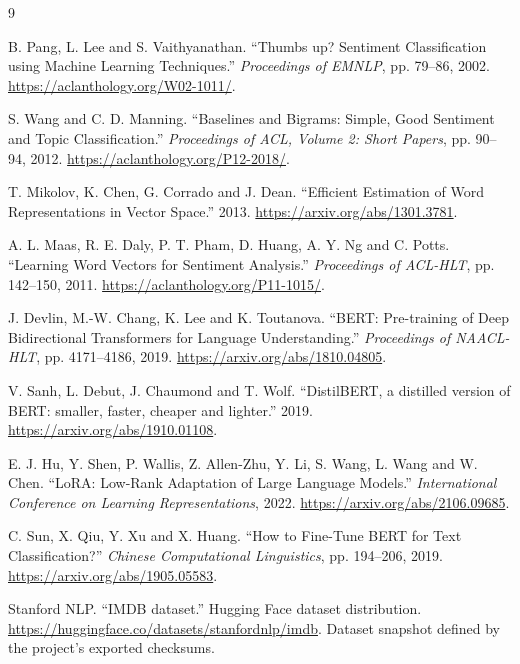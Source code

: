 \begin{thebibliography}{9}
\raggedright
{}
B. Pang, L. Lee and S. Vaithyanathan.
``Thumbs up? Sentiment Classification using Machine Learning Techniques.''
\textit{Proceedings of EMNLP}, pp. 79--86, 2002.
\url{https://aclanthology.org/W02-1011/}.

S. Wang and C. D. Manning.
``Baselines and Bigrams: Simple, Good Sentiment and Topic Classification.''
\textit{Proceedings of ACL, Volume 2: Short Papers}, pp. 90--94, 2012.
\url{https://aclanthology.org/P12-2018/}.

T. Mikolov, K. Chen, G. Corrado and J. Dean.
``Efficient Estimation of Word Representations in Vector Space.'' 2013.
\url{https://arxiv.org/abs/1301.3781}.

A. L. Maas, R. E. Daly, P. T. Pham, D. Huang, A. Y. Ng and C. Potts.
``Learning Word Vectors for Sentiment Analysis.''
\textit{Proceedings of ACL-HLT}, pp. 142--150, 2011.
\url{https://aclanthology.org/P11-1015/}.

J. Devlin, M.-W. Chang, K. Lee and K. Toutanova.
``BERT: Pre-training of Deep Bidirectional Transformers for Language Understanding.''
\textit{Proceedings of NAACL-HLT}, pp. 4171--4186, 2019.
\url{https://arxiv.org/abs/1810.04805}.

V. Sanh, L. Debut, J. Chaumond and T. Wolf.
``DistilBERT, a distilled version of BERT: smaller, faster, cheaper and lighter.''
2019. \url{https://arxiv.org/abs/1910.01108}.

E. J. Hu, Y. Shen, P. Wallis, Z. Allen-Zhu, Y. Li, S. Wang, L. Wang and W. Chen.
``LoRA: Low-Rank Adaptation of Large Language Models.''
\textit{International Conference on Learning Representations}, 2022.
\url{https://arxiv.org/abs/2106.09685}.

C. Sun, X. Qiu, Y. Xu and X. Huang.
``How to Fine-Tune BERT for Text Classification?''
\textit{Chinese Computational Linguistics}, pp. 194--206, 2019.
\url{https://arxiv.org/abs/1905.05583}.

Stanford NLP. ``IMDB dataset.'' Hugging Face dataset distribution.
\url{https://huggingface.co/datasets/stanfordnlp/imdb}.
Dataset snapshot defined by the project's exported checksums.

\end{thebibliography}
